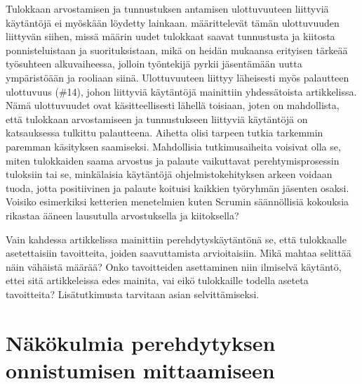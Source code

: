 \documentclass[utf8]{gradu3}
\begin{document}
Tulokkaan arvostamisen ja tunnustuksen antamisen ulottuvuuteen liittyviä käytäntöjä ei myöskään löydetty lainkaan. \textcite{wanberg-2012} määrittelevät tämän ulottuvuuden liittyvän siihen, missä määrin uudet tulokkaat saavat tunnustusta ja kiitosta ponnisteluistaan ja suorituksistaan, mikä on heidän mukaansa erityisen tärkeää työsuhteen alkuvaiheessa, jolloin työntekijä pyrkii jäsentämään uutta ympäristöään ja rooliaan siinä. Ulottuvuuteen liittyy läheisesti myös palautteen ulottuvuus (\#14), johon liittyviä käytäntöjä mainittiin yhdessätoista artikkelissa. Nämä ulottuvuudet ovat käsitteellisesti lähellä toisiaan, joten on mahdollista, että tulokkaan arvostamiseen ja tunnustukseen liittyviä käytäntöjä on katsauksessa tulkittu palautteena. Aihetta olisi tarpeen tutkia tarkemmin paremman käsityksen saamiseksi. Mahdollisia tutkimusaiheita voisivat olla se, miten tulokkaiden saama arvostus ja palaute vaikuttavat perehtymisprosessin tuloksiin tai se, minkälaisia käytäntöjä ohjelmistokehityksen arkeen voidaan tuoda, jotta positiivinen ja palaute koituisi kaikkien työryhmän jäsenten osaksi. Voisiko esimerkiksi ketterien menetelmien kuten Scrumin säännöllisiä kokouksia rikastaa ääneen lausutulla arvostuksella ja kiitoksella?

Vain kahdessa artikkelissa mainittiin perehdytyskäytäntönä se, että tulokkaalle asetettaisiin tavoitteita, joiden saavuttamista arvioitaisiin. Mikä mahtaa selittää näin vähäistä määrää? Onko tavoitteiden asettaminen niin ilmiselvä käytäntö, ettei sitä artikkeleissa edes mainita, vai eikö tulokkaille todella aseteta tavoitteita? Lisätutkimusta tarvitaan asian selvittämiseksi.

\section{Näkökulmia perehdytyksen onnistumisen mittaamiseen}
\label{luku-näkökulmia-perehdytyksen-onnistustumisen-mittaamiseen}
\end{document}
